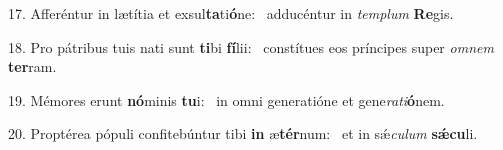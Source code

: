 17. Afferéntur in lætítia et exsul\textbf{ta}ti\textbf{ó}ne: \ast\  adducéntur in \textit{tem}\textit{plum} \textbf{Re}gis.\

18. Pro pátribus tuis nati sunt \textbf{ti}bi \textbf{fí}lii: \ast\  constítues eos príncipes super \textit{om}\textit{nem} \textbf{ter}ram.\

19. Mémores erunt \textbf{nó}minis \textbf{tu}i: \ast\  in omni generatióne et gene\textit{ra}\textit{ti}\textbf{ó}nem.\

20. Proptérea pópuli confitebúntur tibi \textbf{in} æ\textbf{tér}num: \ast\  et in sǽ\textit{cu}\textit{lum} \textbf{sǽ}\textbf{cu}li.\

